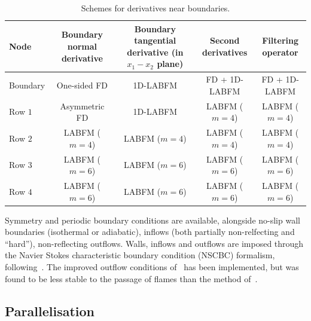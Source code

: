 \documentclass[notitlepage]{revtex4-1}
\begin{document}
\begin{table}
\begin{center}
\caption{Schemes for derivatives near boundaries.\label{tab:boundaries}}
\begin{tabular}{|l|c|c|c|c||}
\hline
\textbf{Node} & Boundary normal derivative & Boundary tangential derivative (in $x_{1}-x_{2}$ plane) & Second derivatives & Filtering operator \\
\hline
Boundary & One-sided FD & 1D-LABFM & FD + 1D-LABFM & FD + 1D-LABFM \\
Row $1$ & Asymmetric FD & 1D-LABFM & LABFM ($m=4$) & LABFM ($m=4$) \\
Row $2$ & LABFM ($m=4$) & LABFM ($m=4$) & LABFM ($m=4$) & LABFM ($m=4$) \\
Row $3$ & LABFM ($m=6$) & LABFM ($m=6$) & LABFM ($m=6$) & LABFM ($m=6$)  \\
Row $4$ & LABFM ($m=6$) & LABFM ($m=6$) & LABFM ($m=6$) & LABFM ($m=6$) \\
\hline
\end{tabular}
\end{center}
\end{table}

Symmetry and periodic boundary conditions are available, alongside no-slip wall boundaries (isothermal or adiabatic), inflows (both partially non-relfecting and ``hard''), non-reflecting outflows. Walls, inflows and outflows are imposed through the Navier Stokes characteristic boundary condition (NSCBC) formalism, following~\cite{sutherland_2003}. The improved outflow conditions of~\cite{yoo_2007} has been implemented, but was found to be less stable to the passage of flames than the method of~\cite{sutherland_2003}.


\subsection{Parallelisation}
\end{document}
